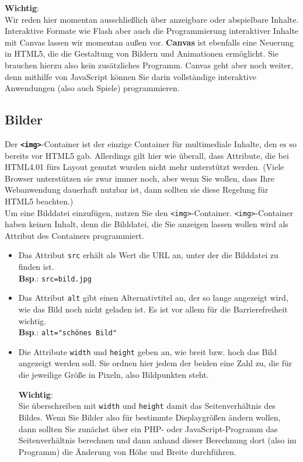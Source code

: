 \textbf{Wichtig}:\\

Wir reden hier momentan ausschließlich über anzeigbare oder abspielbare Inhalte. Interaktive Formate wie Flash aber auch die Programmierung interaktiver Inhalte mit Canvas lassen wir momentan außen vor. \textbf{Canvas} ist ebenfalls eine Neuerung in HTML5, die die Gestaltung von Bildern und Animationen ermöglicht. Sie brauchen hierzu also kein zusätzliches Programm. Canvas geht aber noch weiter, denn mithilfe von JavaScript können Sie darin vollständige interaktive Anwendungen (also auch Spiele) programmieren.

\subsection{Bilder}

Der \textbf{\verb|<img>|}-Container ist der einzige Container für multimediale Inhalte, den es so bereits vor HTML5 gab. Allerdings gilt hier wie überall, dass Attribute, die bei HTML4.01 fürs Layout genutzt wurden nicht mehr unterstützt werden. (Viele Browser unterstützen sie zwar immer noch, aber wenn Sie wollen, dass Ihre Webanwendung dauerhaft nutzbar ist, dann sollten sie diese Regelung für HTML5 beachten.)\\

Um eine Bilddatei einzufügen, nutzen Sie den \verb|<img>|-Container. \verb|<img>|-Container haben keinen Inhalt, denn die Bilddatei, die Sie anzeigen lassen wollen wird als Attribut des Containers programmiert.\\

\begin{itemize}
	\item Das Attribut \verb|src| erhält als Wert die URL an, unter der die Bilddatei zu finden ist.\\
	
	\textbf{Bsp}.: \verb|src=bild.jpg|

	\item Das Attribut \verb|alt| gibt einen Alternativtitel an, der so lange angezeigt wird, wie das Bild noch nicht geladen ist. Es ist vor allem für die Barrierefreiheit wichtig.\\
	
	\textbf{Bsp}.: \verb|alt="schönes Bild"|

	\item Die Attribute \verb|width| und \verb|height| geben an, wie breit bzw. hoch das Bild angezeigt werden soll. Sie ordnen hier jedem der beiden eine Zahl zu, die für die jeweilige Größe in Pixeln, also Bildpunkten steht. 

	\textbf{Wichtig}:\\
	
	Sie überschreiben mit \verb|width| und \verb|height| damit das Seitenverhältnis des Bildes. Wenn Sie Bilder also für bestimmte Displaygrößen ändern wollen, dann sollten Sie zunächst über ein PHP- oder JavaScript-Programm das Seitenverhältnis berechnen und dann anhand dieser Berechnung dort (also im Programm) die Änderung von Höhe und Breite durchführen.
\end{itemize}

